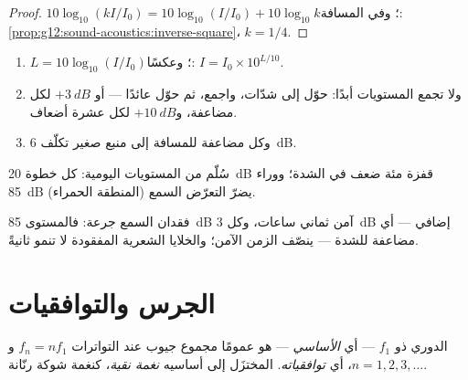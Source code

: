 \begin{proof}
$10\log_{10}(kI/I_0) = 10\log_{10}(I/I_0) + 10\log_{10}k$؛
وفي المسافة: \cref{prop:g12:sound-acoustics:inverse-square}، $k = 1/4$.
\end{proof}

\begin{method}\label{met:g12:sound-acoustics:db}
\begin{enumerate}
  \item $L = 10\log_{10}(I/I_0)$؛ وعكسًا: $I = I_0 \times 10^{L/10}$.
  \item ولا تجمع المستويات أبدًا: حوّل إلى شدّات، واجمع، ثم حوّل عائدًا
        --- أو $+\qty{3}{dB}$ لكل مضاعفة، و$+\qty{10}{dB}$ لكل عشرة أضعاف.
  \item وكل مضاعفة للمسافة إلى منبع صغير تكلّف \qty{6}{dB}.
\end{enumerate}
\end{method}

\begin{omfigure}

{\small سُلّم من المستويات اليومية: كل خطوة \qty{20}{dB} قفزة
مئة ضعف في الشدة؛ ووراء \qty{85}{dB} (المنطقة الحمراء) يضرّ التعرّض
السمع.}
\end{omfigure}

\begin{remark}\label{rem:g12:sound-acoustics:damage}
فقدان السمع جرعة: فالمستوى \qty{85}{dB} آمن ثماني ساعات، وكل
\qty{3}{dB} إضافي --- أي مضاعفة للشدة --- ينصّف الزمن
الآمن؛ والخلايا الشعرية المفقودة لا تنمو ثانيةً.
\end{remark}

\section{الجرس والتوافقيات}

\begin{definition}[التوافقيات]\label{def:g12:sound-acoustics:harmonics}
 الدوري ذو  $f_1$ --- أي
\emph{الأساسي} --- هو عمومًا مجموع
جيوب عند التواترات $f_n = n f_1$ و$n = 1, 2, 3, \dots$، أي
\emph{توافقياته}.  المختزَل إلى أساسيه
\emph{نغمة نقية}، كنغمة شوكة رنّانة.
\end{definition}


